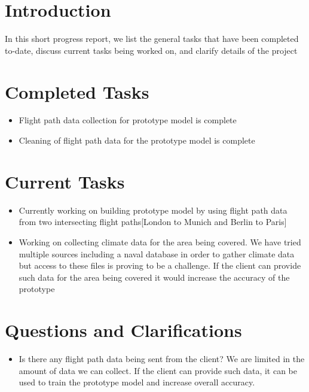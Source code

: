 \documentclass[12pt]{article}
\begin{document}
\section{Introduction}
In this short progress report, we list the general tasks that have been completed to-date, discuss current tasks being worked on, and clarify details of the project

\section{Completed Tasks}
\begin{itemize}
\item Flight path data collection for prototype model is complete
\item Cleaning of flight path data for the prototype model is complete
\end{itemize}

\section{Current Tasks}
\begin{itemize}
    \item Currently working on building prototype model by using flight path data from two intersecting flight paths[London to Munich and Berlin to Paris]
    \item Working on collecting climate data for the area being covered. We have tried multiple sources including a naval database in order to gather climate data but access to these files is proving to be a challenge. If the client can provide such data for the area being covered it would increase the accuracy of the prototype
\end{itemize}

\section{Questions and Clarifications}
\begin{itemize}
    \item Is there any flight path data being sent from the client? We are limited in the amount of data we can collect. If the client can provide such data, it can be used to train the prototype model and increase overall accuracy. 
\end{itemize}
\end{document}
